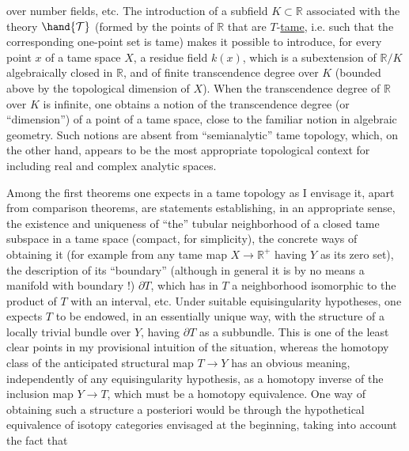 
over number fields, etc. The introduction of a subfield
$K \subset \mathbb{R}$ associated with the theory $\hand{\mathcal{T}}$ (formed by the points of $\mathbb{R}$ that are
$T$-\uline{tame}, i.e. such that the corresponding one-point set
is tame) makes it possible to introduce, for every point $x$ of a tame space
$X$, a residue field $k(x)$, which is a subextension of $\mathbb{R}/K$
algebraically closed in $\mathbb{R}$, and of finite transcendence degree
over $K$ (bounded above by the topological dimension of $X$). When the
transcendence degree of $\mathbb{R}$ over $K$ is infinite, one obtains a
notion of the transcendence degree (or ``dimension'') of a point of a
tame space, close to the familiar notion in algebraic
geometry. Such notions are absent from ``semianalytic'' tame
topology, which, on the other hand, appears to be the most appropriate
topological context for including real
and complex analytic spaces.

Among the first theorems one expects in
a tame topology as I envisage it, apart from comparison
theorems, are statements establishing, in an
appropriate sense, the existence and uniqueness of ``the'' tubular neighborhood
of a closed tame subspace in a tame space (compact, for
simplicity), the concrete ways of obtaining it (for example from
any tame map $X \longrightarrow \mathbb{R}^{+}$ having $Y$ as
its zero set), the description of its ``boundary'' (although in
general it is by no means a manifold with boundary !) $\partial T$, which has
in $T$ a neighborhood isomorphic to the product of $T$ with an interval,
etc. Under suitable equisingularity hypotheses, one
expects $T$ to be endowed, in an essentially unique way,
with the structure of a locally trivial bundle over $Y$, having $\partial T$
as a subbundle. This is one of the least clear points in
my provisional intuition of the situation, whereas the
homotopy class of the anticipated structural map $T \longrightarrow Y$
has an obvious meaning, independently of any equisingularity
hypothesis, as a homotopy inverse of the inclusion map $Y \longrightarrow T$,
which must be a homotopy equivalence. One way of obtaining
such a structure a posteriori would be through the hypothetical equivalence of
isotopy categories envisaged at the beginning, taking into account the fact that

